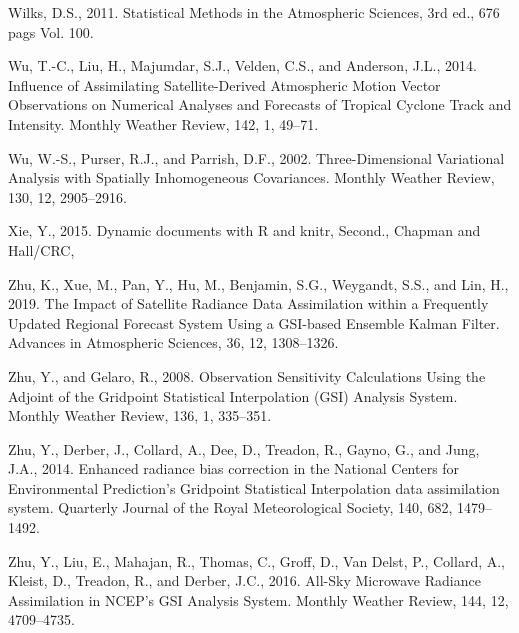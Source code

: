 \documentclass[12pt,oneside,a4paper]{reedthesis}
\begin{document}
\leavevmode\hypertarget{ref-wilks2011}{}%
Wilks, D.S., 2011. Statistical Methods in the Atmospheric Sciences, 3rd ed., 676 pags Vol. 100.

\leavevmode\hypertarget{ref-wu2014}{}%
Wu, T.-C., Liu, H., Majumdar, S.J., Velden, C.S., and Anderson, J.L., 2014. Influence of Assimilating Satellite-Derived Atmospheric Motion Vector Observations on Numerical Analyses and Forecasts of Tropical Cyclone Track and Intensity. Monthly Weather Review, 142, 1, 49--71.

\leavevmode\hypertarget{ref-wu2002}{}%
Wu, W.-S., Purser, R.J., and Parrish, D.F., 2002. Three-Dimensional Variational Analysis with Spatially Inhomogeneous Covariances. Monthly Weather Review, 130, 12, 2905--2916.

\leavevmode\hypertarget{ref-xie2015}{}%
Xie, Y., 2015. Dynamic documents with R and knitr, Second., Chapman and Hall/CRC,

\leavevmode\hypertarget{ref-zhu2019}{}%
Zhu, K., Xue, M., Pan, Y., Hu, M., Benjamin, S.G., Weygandt, S.S., and Lin, H., 2019. The Impact of Satellite Radiance Data Assimilation within a Frequently Updated Regional Forecast System Using a GSI-based Ensemble Kalman Filter. Advances in Atmospheric Sciences, 36, 12, 1308--1326.

\leavevmode\hypertarget{ref-zhu2008}{}%
Zhu, Y., and Gelaro, R., 2008. Observation Sensitivity Calculations Using the Adjoint of the Gridpoint Statistical Interpolation (GSI) Analysis System. Monthly Weather Review, 136, 1, 335--351.

\leavevmode\hypertarget{ref-zhu2014}{}%
Zhu, Y., Derber, J., Collard, A., Dee, D., Treadon, R., Gayno, G., and Jung, J.A., 2014. Enhanced radiance bias correction in the National Centers for Environmental Prediction's Gridpoint Statistical Interpolation data assimilation system. Quarterly Journal of the Royal Meteorological Society, 140, 682, 1479--1492.

\leavevmode\hypertarget{ref-zhu2016}{}%
Zhu, Y., Liu, E., Mahajan, R., Thomas, C., Groff, D., Van Delst, P., Collard, A., Kleist, D., Treadon, R., and Derber, J.C., 2016. All-Sky Microwave Radiance Assimilation in NCEP's GSI Analysis System. Monthly Weather Review, 144, 12, 4709--4735.


\end{document}
